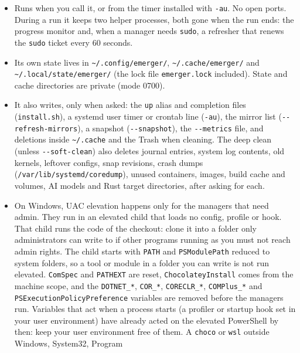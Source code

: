 \documentclass[11pt,a4paper]{article}
\begin{document}
\begin{itemize}
  \item Runs when you call it, or from the timer installed with
        \texttt{-au}. No open ports. During a run it keeps two helper
        processes, both gone when the run ends: the progress monitor and,
        when a manager needs \texttt{sudo}, a refresher that renews the
        \texttt{sudo} ticket every 60 seconds.
  \item Its own state lives in \verb|~/.config/emerger/|,
        \verb|~/.cache/emerger/| and \verb|~/.local/state/emerger/|
        (the lock file \texttt{emerger.lock} included). State and cache
        directories are private (mode 0700).
  \item It also writes, only when asked: the \texttt{up} alias and
        completion files (\texttt{install.sh}), a systemd user timer or
        crontab line (\texttt{-au}), the mirror list
        (\texttt{-{}-refresh-mirrors}), a snapshot (\texttt{-{}-snapshot}),
        the \texttt{-{}-metrics} file, and deletions inside
        \verb|~/.cache| and the Trash when cleaning.
        The deep clean (unless \texttt{-{}-soft-clean}) also deletes
        journal entries, system log contents, old kernels, leftover
        configs, snap revisions, crash dumps
        (\verb|/var/lib/systemd/coredump|), unused containers, images,
        build cache and volumes, AI models and Rust target directories,
        after asking for each.
  \item On Windows, UAC elevation happens only for the managers that need
        admin. They run in an elevated child that loads no config, profile
        or hook. That child runs the code of the checkout: clone it into a
        folder only administrators can write to if other programs running
        as you must not reach admin rights. The child starts with
        \texttt{PATH} and \texttt{PSModulePath} reduced to system folders, so
        a tool or module in a folder you can write is not run elevated.
        \texttt{ComSpec} and \texttt{PATHEXT} are reset, \texttt{ChocolateyInstall}
        comes from the machine scope, and the \texttt{DOTNET\_*}, \texttt{COR\_*},
        \texttt{CORECLR\_*}, \texttt{COMPlus\_*} and
        \texttt{PSExecutionPolicyPreference} variables are removed before
        the managers run. Variables that act when a process starts (a
        profiler or startup hook set in your user environment) have already
        acted on the elevated PowerShell by then: keep your user environment
        free of them. A
        \texttt{choco} or \texttt{wsl} outside Windows, System32, Program

\end{itemize}
\end{document}
